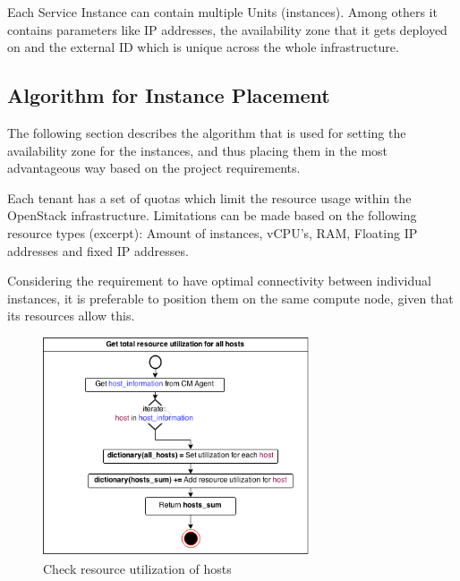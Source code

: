 Each Service Instance can contain multiple Units (instances). Among others it contains parameters like IP addresses, the availability zone that it gets deployed on and the external ID which is unique across the whole infrastructure.



\subsection{Algorithm for Instance Placement}

The following section describes the algorithm that is used for setting the availability zone for the instances, and thus placing them in the most advantageous way based on the project requirements.


Each tenant has a set of quotas which limit the resource usage within the OpenStack infrastructure. Limitations can be made based on the following resource types (excerpt): Amount of instances, vCPU's, RAM, Floating IP addresses and fixed IP addresses.

Considering the requirement to have optimal connectivity between individual instances, it is preferable to position them on the same compute node, given that its resources allow this.

\begin{figure}[H]
\centering

\includegraphics[width=0.7\textwidth]{images/design/cm_get_host_utilization}

\caption{Check resource utilization of hosts}
\end{figure}

